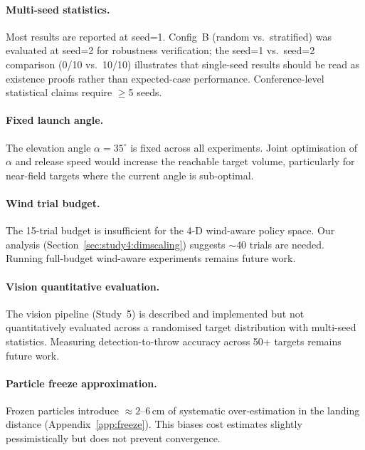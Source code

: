 \paragraph{Multi-seed statistics.}
Most results are reported at seed=1.
Config~B (random vs.\ stratified) was evaluated at seed=2 for robustness verification;
the seed=1 vs.\ seed=2 comparison (0/10 vs.\ 10/10) illustrates that single-seed
results should be read as existence proofs rather than expected-case performance.
Conference-level statistical claims require $\geq$5 seeds.

\paragraph{Fixed launch angle.}
The elevation angle $\alpha = 35^\circ$ is fixed across all experiments.
Joint optimisation of $\alpha$ and release speed would increase the reachable target
volume, particularly for near-field targets where the current angle is sub-optimal.

\paragraph{Wind trial budget.}
The 15-trial budget is insufficient for the 4-D wind-aware policy space.
Our analysis (Section~\ref{sec:study4:dimscaling}) suggests $\sim$40 trials are needed.
Running full-budget wind-aware experiments remains future work.

\paragraph{Vision quantitative evaluation.}
The vision pipeline (Study~5) is described and implemented but not quantitatively
evaluated across a randomised target distribution with multi-seed statistics.
Measuring detection-to-throw accuracy across 50+ targets remains future work.

\paragraph{Particle freeze approximation.}
Frozen particles introduce $\approx 2$--6\,cm of systematic over-estimation in the
landing distance (Appendix~\ref{app:freeze}).
This biases cost estimates slightly pessimistically but does not prevent convergence.
